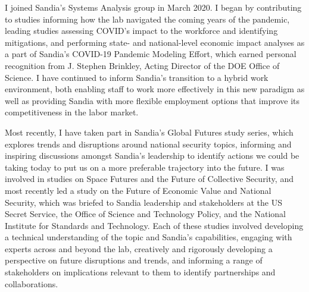 \documentclass[10pt]{article}
\begin{document}

I joined Sandia's Systems Analysis group in March 2020. I began by contributing to studies informing how the lab navigated the coming years of the pandemic, leading studies assessing COVID's impact to the workforce and identifying mitigations, and performing state- and national-level economic impact analyses as a part of Sandia's COVID-19 Pandemic Modeling Effort, which earned personal recognition from J. Stephen Brinkley, Acting Director of the DOE Office of Science. I have continued to inform Sandia's transition to a hybrid work environment, both enabling staff to work more effectively in this new paradigm as well as providing Sandia with more flexible employment options that improve its competitiveness in the labor market.

Most recently, I have taken part in Sandia's Global Futures study series, which explores trends and disruptions around national security topics, informing and inspiring discussions amongst Sandia's leadership to identify actions we could be taking today to put us on a more preferable trajectory into the future. I was involved in studies on Space Futures and the Future of Collective Security, and most recently led a study on the Future of Economic Value and National Security, which was briefed to Sandia leadership and stakeholders at the US Secret Service, the Office of Science and Technology Policy, and the National Institute for Standards and Technology. Each of these studies involved developing a technical understanding of the topic and Sandia's capabilities, engaging with experts across and beyond the lab, creatively and rigorously developing a perspective on future disruptions and trends, and informing a range of stakeholders on implications relevant to them to identify partnerships and collaborations.
\end{document}
